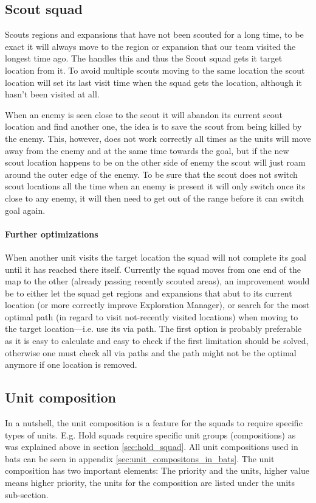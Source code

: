 \subsection{Scout squad}
\label{sec:scout_squad}
Scouts regions and expansions that have not been scouted for a long time, to be exact it will always move to the region or expansion that our team visited the longest time ago. The  handles this and thus the Scout squad gets it target location from it. To avoid multiple scouts moving to the same location the scout location will set its last visit time when the squad gets the location, although it hasn't been visited at all.

When an enemy is seen close to the scout it will abandon its current scout location and find another one, the idea is to save the scout from being killed by the enemy. This, however, does not work correctly all times as the units will move away from the enemy and at the same time towards the goal, but if the new scout location happens to be on the other side of enemy the scout will just roam around the outer edge of the enemy. To be sure that the scout does not switch scout locations all the time when an enemy is present it will only switch once its close to any enemy, it will then need to get out of the range before it can switch goal again.

\paragraph{Further optimizations}
When another unit visits the target location the squad will not complete its goal until it has reached there itself. Currently the squad moves from one end of the map to the other (already passing recently scouted areas), an improvement would be to either let the squad get regions and expansions that abut to its current location (or more correctly improve Exploration Manager), or search for the most optimal path (in regard to visit not-recently visited locations) when moving to the target location—i.e. use its via path. The first option is probably preferable as it is easy to calculate and easy to check if the first limitation should be solved, otherwise one must check all via paths and the path might not be the optimal anymore if one location is removed.

\subsection{Unit composition}
\label{sec:unit_composition}
In a nutshell, the unit composition is a feature for the squads to require specific types of units. E.g. Hold squads require specific unit groups (compositions) as was explained above in section \ref{sec:hold_squad}. All unit compositions used in bats can be seen in appendix \ref{sec:unit_compositons_in_bats}. The unit composition has two important elements: The priority and the units, higher value means higher priority, the units for the composition are listed under the units sub-section.

